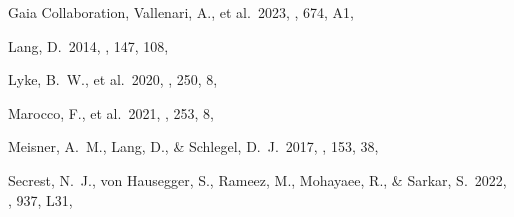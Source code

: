 \documentclass[fleqn,usenatbib]{mnras}
\begin{document}

\begin{thebibliography}{}

Gaia Collaboration, Vallenari, A., et al.\ 2023, \aap, 674, A1, 

Lang, D.\ 2014, \aj, 147, 108, 

Lyke, B.~W., et al.\ 2020, \apjs, 250, 8, 

Marocco, F., et al.\ 2021, \apjs, 253, 8, 

Meisner, A.~M., Lang, D., \& Schlegel, D.~J.\ 2017, \aj, 153, 38, 

Secrest, N.~J., von Hausegger, S., Rameez, M., Mohayaee, R., \& Sarkar, S.\ 2022, \apjl, 937, L31, 

\end{thebibliography}
\end{document}
